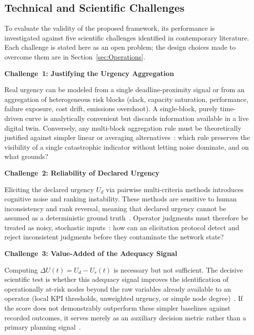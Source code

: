 \subsection{Technical and Scientific Challenges}
\label{sec:locks}

To evaluate the validity of the proposed framework, its performance is investigated against five scientific challenges identified in contemporary literature. Each challenge is stated here as an open problem; the design choices made to overcome them are in Section~\ref{sec:Operations}.

\begin{attentionBox}
\noindent\textbf{Challenge~1: Justifying the Urgency Aggregation}

\smallskip
Real urgency can be modeled from a single deadline-proximity signal or from an aggregation of heterogeneous risk blocks (slack, capacity saturation, performance, failure exposure, cost drift, emissions overshoot). A single-block, purely time-driven curve is analytically convenient but discards information available in a live digital twin. Conversely, any multi-block aggregation rule must be theoretically justified against simpler linear or averaging alternatives~\autocite{cheng1992scheduling,cheng1996due,cheng2025survey,miller2010}: which rule preserves the visibility of a single catastrophic indicator without letting noise dominate, and on what grounds?
\end{attentionBox}

\begin{attentionBox}
\noindent\textbf{Challenge~2: Reliability of Declared Urgency}

\smallskip
Eliciting the declared urgency $U_d$ via pairwise multi-criteria methods introduces cognitive noise and ranking instability. These methods are sensitive to human inconsistency and rank reversal, meaning that declared urgency cannot be assumed as a deterministic ground truth~\autocite{afrasiabi2022extended,triantaphyllou2024,liang2020}. Operator judgments must therefore be treated as noisy, stochastic inputs~\autocite{stam1997}: how can an elicitation protocol detect and reject inconsistent judgments before they contaminate the network state?
\end{attentionBox}

\begin{attentionBox}
\noindent\textbf{Challenge~3: Value-Added of the Adequacy Signal}

\smallskip
Computing $\Delta U(t) = U_d - U_r(t)$ is necessary but not sufficient. The decisive scientific test is whether this adequacy signal improves the identification of operationally at-risk nodes beyond the raw variables already available to an operator (local KPI thresholds, unweighted urgency, or simple node degree)~\autocite{cohen2021assigning,bojarski2021}. If the score does not demonstrably outperform these simpler baselines against recorded outcomes, it serves merely as an auxiliary decision metric rather than a primary planning signal~\autocite{ahmetoglu2025,turner2021}.
\end{attentionBox}

